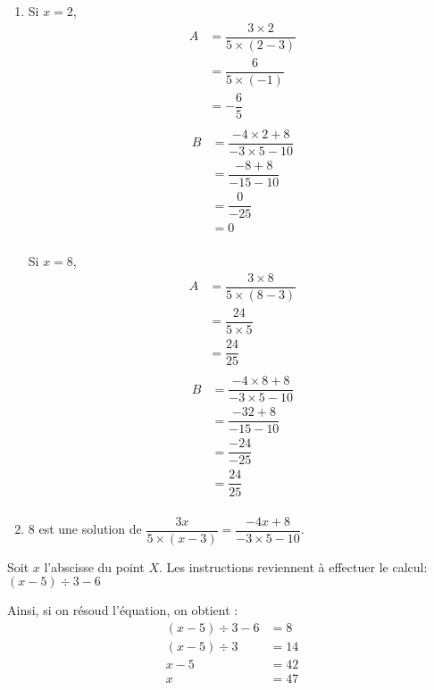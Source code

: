 \documentclass[noheader]{évaluation}
\begin{document}
\begin{exercice}
	\begin{enumerate}
		\item  \begin{multicols}{3}
			      Si $x = 2$,
			      \columnbreak
			      \begin{align*}
				      A & = \dfrac{3 × 2}{5 × (2 - 3)} \\
				        & = \dfrac{6}{5 × (-1)}        \\
				        & = -\dfrac{6}{5}              \\
			      \end{align*}
			      \columnbreak
			      \begin{align*}
				      B & = \dfrac{-4 × 2 + 8}{-3 × 5 - 10} \\
				        & = \dfrac{-8 + 8}{-15 - 10}        \\
				        & = \dfrac{0}{-25}                  \\
				        & = 0                               \\
			      \end{align*}
		      \end{multicols}


		      \begin{multicols}{3}
			      Si $x = 8$,
			      \columnbreak
			      \begin{align*}
				      A & = \dfrac{3 × 8}{5 × (8 - 3)} \\
				        & = \dfrac{24}{5 × 5}          \\
				        & = \dfrac{24}{25}             \\
			      \end{align*}
			      \columnbreak
			      \begin{align*}
				      B & = \dfrac{-4 × 8 + 8}{-3 × 5 - 10} \\
				        & = \dfrac{-32 + 8}{-15 - 10}       \\
				        & = \dfrac{-24}{-25}                \\
				        & = \dfrac{24}{25}                  \\
			      \end{align*}
		      \end{multicols}
		\item $8$ est une solution de $\dfrac{3x}{5 × (x - 3)} = \dfrac{-4x + 8}{-3 × 5 - 10}$.
	\end{enumerate}
\end{exercice}

\begin{exercice}
	Soit $x$ l'abscisse du point $X$. Les instructions reviennent à effectuer le calcul: $ (x - 5) ÷ 3 - 6 $

	Ainsi, si on résoud l'équation, on obtient :
	\begin{align*}
		(x - 5) ÷ 3 - 6 & = 8  \\
		(x - 5) ÷ 3     & = 14 \\
		x - 5           & = 42 \\
		x               & = 47
	\end{align*}
\end{exercice}
\end{document}
